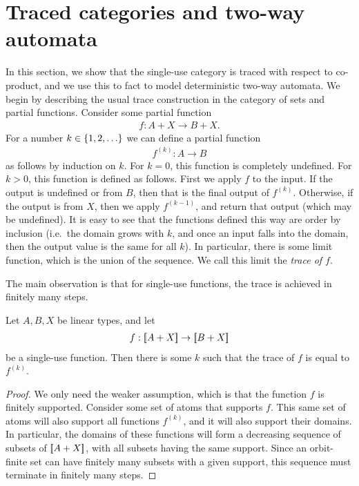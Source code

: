 \section{Traced categories and two-way automata}
\label{sec:two-way-automata}

In this section, we show that the single-use category is traced with respect to co-product, and we use this to fact to model deterministic two-way automata.
We begin by describing the usual trace construction in the category of sets and partial functions. 
Consider some partial function 
\begin{align*}
f : A + X \to B + X.
\end{align*}
For a number $k \in \{1,2,\ldots\}$ we can define a partial function  
\begin{align*}
f^{(k)} : A \to B
\end{align*}
as follows by induction on $k$.  For $k =0$, this function is completely undefined. For $k > 0$, this function is defined as follows. First we apply $f$ to the input. If the output is undefined or from  $B$, then that is the final output of $f^{(k)}$. Otherwise, if the output is from $X$, then we apply $f^{(k-1)}$, and return that output (which may be undefined). It is easy to see that the functions defined this way are order by inclusion (i.e.~the domain grows with $k$, and once an input falls into the domain, then the output value is the same for all $k$). In particular, there is some limit function, which is the union of the sequence. We call this limit the \emph{trace of $f$}. 

The main observation is that for single-use functions, the trace is achieved in finitely many steps.
\begin{lemma}
    Let $A,B,X$ be linear types, and let 
    \begin{align*}
        f : [{\kern-0.45ex}[A + X]{\kern-0.45ex}] \to [{\kern-0.45ex}[B + X]{\kern-0.45ex}]
        \end{align*}
        be a single-use function. Then there is some $k$ such that the trace of $f$ is equal to $f^{(k)}$.
\end{lemma}
\begin{proof}
    We only need the weaker assumption, which is that the function $f$ is finitely supported. Consider some set of atoms that supports $f$. This same set of atoms will also support all functions $f^{(k)}$, and it will also support their domains. In particular, the domains of these functions will form a decreasing sequence of subsets of $[{\kern-0.45ex}[A + X]{\kern-0.45ex}]$, with all subsets having the same support. Since an orbit-finite set can have finitely many subsets with a given support, this sequence must terminate in finitely many steps.
\end{proof}

